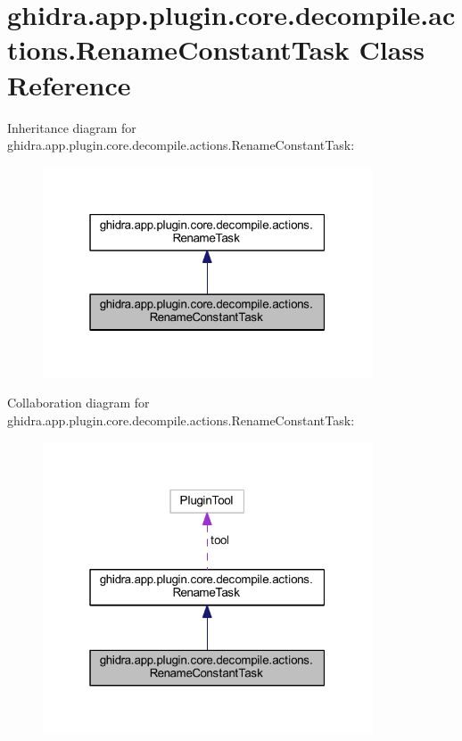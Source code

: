 \hypertarget{classghidra_1_1app_1_1plugin_1_1core_1_1decompile_1_1actions_1_1_rename_constant_task}{}\section{ghidra.\+app.\+plugin.\+core.\+decompile.\+actions.\+Rename\+Constant\+Task Class Reference}
\label{classghidra_1_1app_1_1plugin_1_1core_1_1decompile_1_1actions_1_1_rename_constant_task}


Inheritance diagram for ghidra.\+app.\+plugin.\+core.\+decompile.\+actions.\+Rename\+Constant\+Task\+:
\nopagebreak
\begin{figure}[H]
\begin{center}
\leavevmode
\includegraphics[width=277pt]{classghidra_1_1app_1_1plugin_1_1core_1_1decompile_1_1actions_1_1_rename_constant_task__inherit__graph}
\end{center}
\end{figure}


Collaboration diagram for ghidra.\+app.\+plugin.\+core.\+decompile.\+actions.\+Rename\+Constant\+Task\+:
\nopagebreak
\begin{figure}[H]
\begin{center}
\leavevmode
\includegraphics[width=277pt]{classghidra_1_1app_1_1plugin_1_1core_1_1decompile_1_1actions_1_1_rename_constant_task__coll__graph}
\end{center}
\end{figure}
